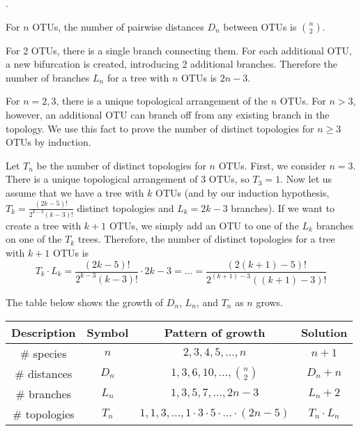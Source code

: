 \documentclass[a4paper, 10pt]{article}
\newcounter{prob_num}
\newcommand{\problem}{\vspace{20pt}\arabic{prob_num}.\stepcounter{prob_num}\par}
\begin{document}
\problem

For $n$ OTUs, the number of pairwise distances $D_n$ between OTUs is ${n \choose 2}$.

For 2 OTUs, there is a single branch connecting them. For each additional OTU, a new bifurcation is created, introducing 2 additional branches. Therefore the number of branches $L_n$ for a tree with $n$ OTUs is $2n-3$.

For $n = 2,3$, there is a unique topological arrangement of the $n$ OTUs. For $n > 3$, however, an additional OTU can branch off from any existing branch in the topology. We use this fact to prove the number of distinct topologies for $n \geq 3$ OTUs by induction.

Let $T_n$ be the number of distinct topologies for $n$ OTUs. First, we consider $n = 3$. There is a unique topological arrangement of 3 OTUs, so $T_3 = 1$. Now let us assume that we have a tree with $k$ OTUs (and by our induction hypothesis, $T_k = \frac{(2k - 5)!}{2^{k-3}(k-3)!}$ distinct topologies and $L_k = 2k - 3$ branches). If we want to create a tree with $k+1$ OTUs, we simply add an OTU to one of the $L_k$ branches on one of the $T_k$ trees. Therefore, the number of distinct topologies for a tree with $k+1$ OTUs is
\[ T_k \cdot L_k = \frac{(2k - 5)!}{2^{k-3}(k-3)!} \cdot 2k - 3 = ... = \frac{(2(k+1) - 5)!}{2^{(k+1)-3}((k+1)-3)!} \]


The table below shows the growth of $D_n$, $L_n$, and $T_n$ as $n$ grows.
\renewcommand{\arraystretch}{1.5}
\begin{center}
\begin{tabular}{|c|c|c|c|}
  \hline
  \textbf{Description} & \textbf{Symbol} & \textbf{Pattern of growth} & \textbf{Solution}\\
  \hline
  \# species    & $n$   & $2,3,4,5,...,n$                              & $n+1$           \\
  \# distances  & $D_n$ & $1,3,6,10,..., {n \choose 2}$                & $D_n + n$       \\
  \# branches   & $L_n$ & $1,3,5,7,..., 2n-3$                          & $L_n + 2$       \\
  \# topologies & $T_n$ & $1,1,3,...,1\cdot3\cdot5\cdot...\cdot(2n-5)$ & $T_n \cdot L_n$ \\
  \hline
\end{tabular}
\end{center}
\renewcommand{\arraystretch}{1}
\end{document}
